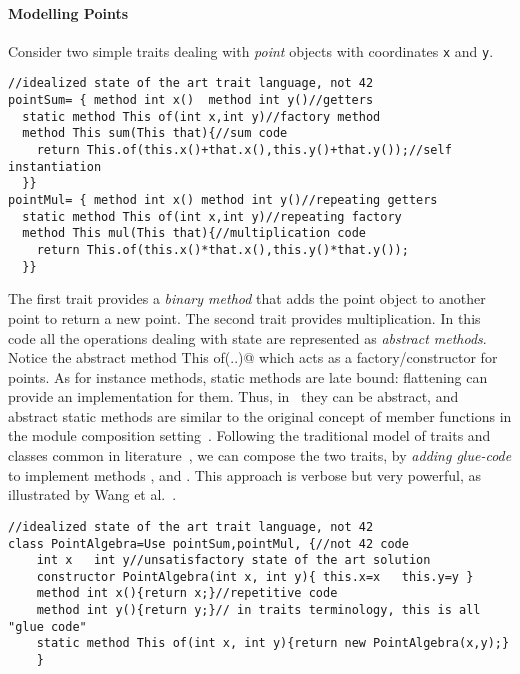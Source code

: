 \paragraph{Modelling Points} Consider two simple 
traits dealing with \emph{point} objects with coordinates \lstinline{x} and
\lstinline{y}.
\saveSpace\saveSpace
\begin{lstlisting}
//idealized state of the art trait language, not 42
pointSum= { method int x()  method int y()//getters
  static method This of(int x,int y)//factory method
  method This sum(This that){//sum code
    return This.of(this.x()+that.x(),this.y()+that.y());//self instantiation
  }}
pointMul= { method int x() method int y()//repeating getters
  static method This of(int x,int y)//repeating factory
  method This mul(This that){//multiplication code
    return This.of(this.x()*that.x(),this.y()*that.y());
  }}
\end{lstlisting}
\saveSpace\saveSpace
The first trait provides a \emph{binary method} that 
adds the point object to another point to return a new point. 
The second trait provides multiplication.
\noindent In this code all the operations dealing with state are represented as \emph{abstract methods}.
Notice the abstract \Q@static method This of(..)@ which acts as a factory/constructor
for points. 
As for instance methods, static methods are late bound:  flattening can provide an implementation for them.
Thus, in \name\ they can be abstract, and abstract static methods are similar to the original concept of member functions in the module composition setting~\cite{ancona2002calculus}.
Following the traditional model of traits and classes common in literature~\cite{ducasse2006traits},
we can compose the two traits, by \emph{adding glue-code}
to implement methods \Q@x@, \Q@y@ and \Q@of@.
This approach is verbose but very
powerful, as illustrated by Wang et al.~\cite{wang2016classless}.
\saveSpace\saveSpace
\begin{lstlisting}
//idealized state of the art trait language, not 42
class PointAlgebra=Use pointSum,pointMul, {//not 42 code
    int x   int y//unsatisfactory state of the art solution
    constructor PointAlgebra(int x, int y){ this.x=x   this.y=y }
    method int x(){return x;}//repetitive code
    method int y(){return y;}// in traits terminology, this is all "glue code"
    static method This of(int x, int y){return new PointAlgebra(x,y);}
    }
\end{lstlisting}
\saveSpace\saveSpace

